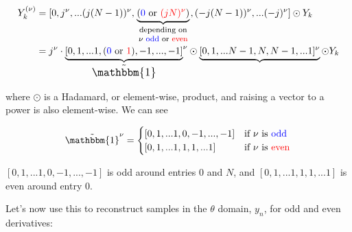 \documentclass[10pt]{article}
\begin{document}
\begin{align*}
Y_k^{(\nu)} &= [0, j^\nu, ... (j(N-1))^\nu, \underbrace{(\color{blue}0\color{black} \text{ or } \color{red}(jN)^\nu\color{black})}_{\parbox{20mm}{\footnotesize \centering depending on $\nu$ \color{blue}odd \color{black} or \color{red}even}}, (-j(N-1))^\nu, ... (-j)^\nu] \odot Y_k\\
&= j^\nu \cdot {\underbrace{[0, 1, ... 1, (\color{blue}0 \color{black}\text{ or }\color{red} 1\color{black}), -1, ..., -1]}_{\text{\large $\tilde{\mathbbm{1}}$}}}^\nu \odot \underbrace{[0, 1, ... N-1, N, N-1, ... 1]^\nu} \odot Y_k
\end{align*}

where $\odot$ is a Hadamard, or element-wise, product, and raising a vector to a power is also element-wise. We can see

$$\tilde{\mathbbm{1}}^\nu = \begin{cases} [0, 1, ... 1, 0, -1, ..., -1] & \text{if $\nu$ is \color{blue}odd}\\ [0, 1, ... 1, 1, 1, ... 1] & \text{if $\nu$ is \color{red}even}\end{cases}$$

$[0, 1, ... 1, 0, -1, ..., -1]$ is odd around entries $0$ and $N$, and $[0, 1, ... 1, 1, 1, ... 1]$ is even around entry $0$.\newline

Let's now use this to reconstruct samples in the $\theta$ domain, $y_n$, for odd and even derivatives:
\end{document}
